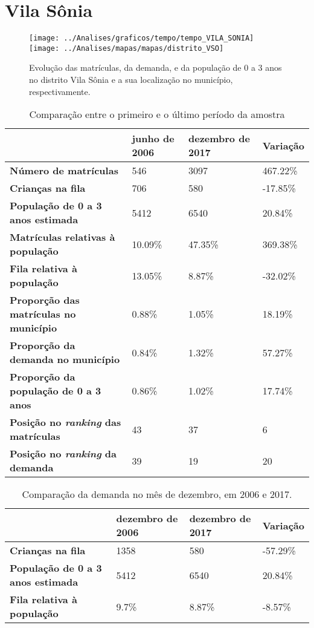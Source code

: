 \section{Vila Sônia}
\begin{figure}[H]
	\centering
	\texttt{[image: ../Analises/graficos/tempo/tempo\_VILA\_SONIA]}
	\texttt{[image: ../Analises/mapas/mapas/distrito\_VSO]}
	\caption{Evolução das matrículas, da demanda, e da população de 0 a 3 anos no distrito Vila Sônia e a sua localização no município, respectivamente.}
\end{figure}
\begin{table}[H]
	\begin{tabular}{|l|l|l|l|}
		\hline
		\textbf{}                                      & \textbf{junho de 2006}       & \textbf{dezembro de 2017}    & \textbf{Variação} \\ \hline
		\textbf{Número de matrículas}                  & 546 & 3097 & 467.22\% \\ \hline
		\textbf{Crianças na fila}                      & 706 & 580 & -17.85\% \\ \hline
		\textbf{População de 0 a 3 anos estimada}      & 5412 & 6540 & 20.84\% \\ \hline
		\textbf{Matrículas relativas à população}      & 10.09\% & 47.35\% & 369.38\% \\ \hline
		\textbf{Fila relativa à população}             & 13.05\% & 8.87\% & -32.02\% \\ \hline
		\textbf{Proporção das matrículas no município} & 0.88\% & 1.05\% & 18.19\% \\ \hline
		\textbf{Proporção da demanda no município}     & 0.84\% & 1.32\% & 57.27\% \\ \hline
		\textbf{Proporção da população de 0 a 3 anos}  & 0.86\% & 1.02\% & 17.74\% \\ \hline
		\textbf{Posição no \textit{ranking} das matrículas}     & 43 & 37 & 6 \\ \hline
		\textbf{Posição no \textit{ranking} da demanda}         & 39 & 19 & 20 \\ \hline
	\end{tabular}
	\caption{Comparação entre o primeiro e o último período da amostra}
\end{table}
\begin{table}[H]
	\begin{tabular}{|l|l|l|l|}
		\hline
		\textbf{}                                 & \textbf{dezembro de 2006} & \textbf{dezembro de 2017} & \textbf{Variação} \\ \hline
		\textbf{Crianças na fila}                      & 1358 & 580 & -57.29\% \\ \hline
		\textbf{População de 0 a 3 anos estimada}      & 5412 & 6540 & 20.84\% \\ \hline
		\textbf{Fila relativa à população}             & 9.7\% & 8.87\% & -8.57\% \\ \hline
	\end{tabular}
	\caption{Comparação da demanda no mês de dezembro, em 2006 e 2017.}
\end{table}